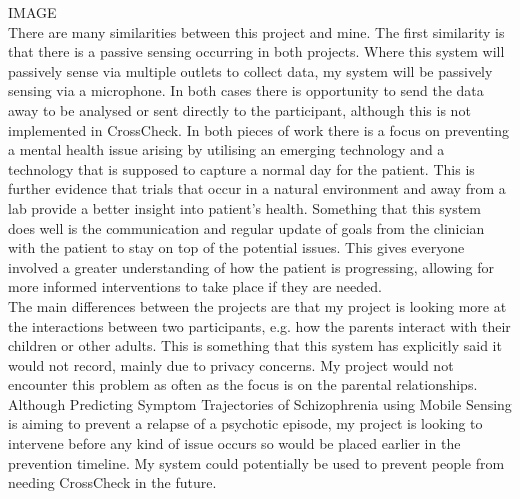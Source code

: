 \documentclass[a4paper,11pt]{report}
\begin{document}
IMAGE\\

There are many similarities between this project and mine. The first similarity is that there is a passive sensing occurring in both projects. Where this system will passively sense via multiple outlets to collect data, my system will be passively sensing via a microphone. In both cases there is opportunity to send the data away to be analysed or sent directly to the participant, although this is not implemented in CrossCheck. In both pieces of work there is a focus on preventing a mental health issue arising by utilising an emerging technology and a technology that is supposed to capture a normal day for the patient. This is further evidence that trials that occur in a natural environment and away from a lab provide a better insight into patient’s health. Something that this system does well is the communication and regular update of goals from the clinician with the patient to stay on top of the potential issues. This gives everyone involved a greater understanding of how the patient is progressing, allowing for more informed interventions to take place if they are needed. \\

The main differences between the projects are that my project is looking more at the interactions between two participants, e.g. how the parents interact with their children or other adults. This is something that this system has explicitly said it would not record, mainly due to privacy concerns. My project would not encounter this problem as often as the focus is on the parental relationships. Although Predicting Symptom Trajectories of Schizophrenia using Mobile Sensing is aiming to prevent a relapse of a psychotic episode, my project is looking to intervene before any kind of issue occurs so would be placed earlier in the prevention timeline. My system could potentially be used to prevent people from needing CrossCheck in the future.\\
\end{document}
